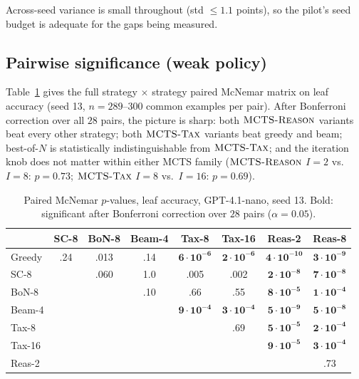 Across-seed variance is small throughout (std $\le 1.1$ points), so the pilot's
seed budget is adequate for the gaps being measured.

\subsection{Pairwise significance (weak policy)}
Table~\ref{tab:mcnemar} gives the full strategy $\times$ strategy paired
McNemar matrix on leaf accuracy (seed 13, $n{=}289$--$300$ common examples per
pair). After Bonferroni correction over all $28$ pairs, the picture is sharp:
both $\textsc{MCTS-Reason}$ variants beat every other strategy; both $\textsc{MCTS-Tax}$ variants
beat greedy and beam; best-of-$N$ is statistically indistinguishable from
$\textsc{MCTS-Tax}$; and the iteration knob does not matter within either MCTS family
($\textsc{MCTS-Reason}$ $I{=}2$ vs.\ $I{=}8$: $p{=}0.73$; $\textsc{MCTS-Tax}$ $I{=}8$ vs.\ $I{=}16$:
$p{=}0.69$).

\begin{table}[h]
\centering
\scriptsize
\setlength{\tabcolsep}{3.5pt}
\begin{tabular}{l ccccccc}
\toprule
 & SC-8 & BoN-8 & Beam-4 & Tax-8 & Tax-16 & Reas-2 & Reas-8 \\
\midrule
Greedy  & .24 & .013 & .14 & $\mathbf{6\!\cdot\!10^{-6}}$ & $\mathbf{2\!\cdot\!10^{-6}}$ & $\mathbf{4\!\cdot\!10^{-10}}$ & $\mathbf{3\!\cdot\!10^{-9}}$ \\
SC-8    &     & .060 & 1.0 & .005 & .002 & $\mathbf{2\!\cdot\!10^{-8}}$ & $\mathbf{7\!\cdot\!10^{-8}}$ \\
BoN-8   &     &      & .10 & .66  & .55  & $\mathbf{8\!\cdot\!10^{-5}}$ & $\mathbf{1\!\cdot\!10^{-4}}$ \\
Beam-4  &     &      &     & $\mathbf{9\!\cdot\!10^{-4}}$ & $\mathbf{3\!\cdot\!10^{-4}}$ & $\mathbf{5\!\cdot\!10^{-9}}$ & $\mathbf{5\!\cdot\!10^{-8}}$ \\
Tax-8   &     &      &     &      & .69  & $\mathbf{5\!\cdot\!10^{-5}}$ & $\mathbf{2\!\cdot\!10^{-4}}$ \\
Tax-16  &     &      &     &      &      & $\mathbf{9\!\cdot\!10^{-5}}$ & $\mathbf{3\!\cdot\!10^{-4}}$ \\
Reas-2  &     &      &     &      &      &      & .73 \\
\bottomrule
\end{tabular}
\caption{Paired McNemar $p$-values, leaf accuracy, GPT-4.1-nano, seed 13.
Bold: significant after Bonferroni correction over $28$ pairs
($\alpha{=}0.05$).}
\label{tab:mcnemar}
\end{table}

